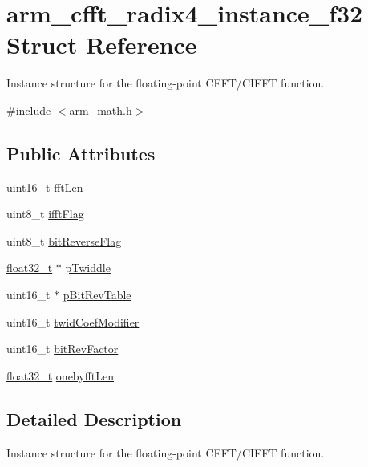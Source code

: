 \hypertarget{structarm__cfft__radix4__instance__f32}{}\section{arm\+\_\+cfft\+\_\+radix4\+\_\+instance\+\_\+f32 Struct Reference}
\label{structarm__cfft__radix4__instance__f32}


Instance structure for the floating-\/point C\+F\+F\+T/\+C\+I\+F\+FT function.  




{\ttfamily \#include $<$arm\+\_\+math.\+h$>$}

\subsection*{Public Attributes}
\begin{DoxyCompactItemize}
\item 
uint16\+\_\+t \hyperlink{structarm__cfft__radix4__instance__f32_a7e6a6d290ce158ce9a15a45e364b021a}{fft\+Len}
\item 
uint8\+\_\+t \hyperlink{structarm__cfft__radix4__instance__f32_a25d1da64dd6487c291f04d226f9acc66}{ifft\+Flag}
\item 
uint8\+\_\+t \hyperlink{structarm__cfft__radix4__instance__f32_ac10927a1620195a88649ce63dab66120}{bit\+Reverse\+Flag}
\item 
\hyperlink{arm__math_8h_a4611b605e45ab401f02cab15c5e38715}{float32\+\_\+t} $\ast$ \hyperlink{structarm__cfft__radix4__instance__f32_a14860c7544911702ca1fa0bf78204ef3}{p\+Twiddle}
\item 
uint16\+\_\+t $\ast$ \hyperlink{structarm__cfft__radix4__instance__f32_a8da0d2ca69749fde8cbb95caeac6fe6a}{p\+Bit\+Rev\+Table}
\item 
uint16\+\_\+t \hyperlink{structarm__cfft__radix4__instance__f32_abe31ea2157dfa233e389cdfd3b9993ee}{twid\+Coef\+Modifier}
\item 
uint16\+\_\+t \hyperlink{structarm__cfft__radix4__instance__f32_acc8cb18a8b901b8321ab9d86491e41a3}{bit\+Rev\+Factor}
\item 
\hyperlink{arm__math_8h_a4611b605e45ab401f02cab15c5e38715}{float32\+\_\+t} \hyperlink{structarm__cfft__radix4__instance__f32_ab9eed39e40b8d7c16381fbccf84467cd}{onebyfft\+Len}
\end{DoxyCompactItemize}


\subsection{Detailed Description}
Instance structure for the floating-\/point C\+F\+F\+T/\+C\+I\+F\+FT function. 

